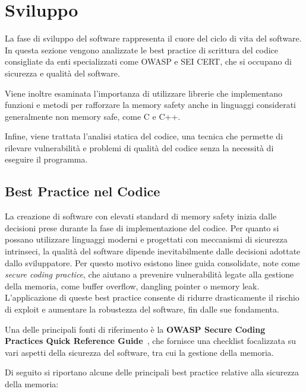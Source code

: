 \section{Sviluppo}
\label{sec:development}

La fase di sviluppo del software rappresenta il cuore del ciclo di vita del software.
In questa sezione vengono analizzate le best practice di scrittura del codice
consigliate da enti specializzati come OWASP e SEI CERT, che si occupano di sicurezza
e qualità del software.

Viene inoltre esaminata l'importanza di utilizzare librerie che implementano funzioni
e metodi per rafforzare la memory safety anche in linguaggi considerati generalmente
non memory safe, come C e C++.

Infine, viene trattata l'analisi statica del codice, una tecnica che permette di
rilevare vulnerabilità e problemi di qualità del codice senza la necessità di
eseguire il programma.

\subsection{Best Practice nel Codice}
\label{sec:best-practices-codice}

La creazione di software con elevati standard di memory safety inizia dalle decisioni
prese durante la fase di implementazione del codice. Per quanto si possano
utilizzare linguaggi moderni e progettati con meccanismi di sicurezza intrinseci,
la qualità del software dipende inevitabilmente dalle decisioni adottate dallo sviluppatore.
Per questo motivo esistono linee guida consolidate, note come \textit{secure
coding practice}, che aiutano a prevenire vulnerabilità legate alla gestione della
memoria, come buffer overflow, dangling pointer o memory leak. L'applicazione di
queste best practice consente di ridurre drasticamente il rischio di exploit e
aumentare la robustezza del software, fin dalle sue fondamenta.

Una delle principali fonti di riferimento è la \textbf{OWASP Secure Coding
Practices Quick Reference Guide}~\cite{owasp_best_practices}, che fornisce una checklist
focalizzata su vari aspetti della sicurezza del software, tra cui la gestione
della memoria.

Di seguito si riportano alcune delle principali best practice relative alla
sicurezza della memoria:

